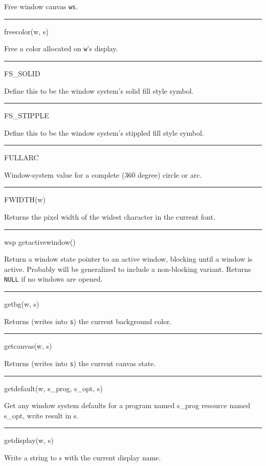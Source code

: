 Free window canvas \texttt{ws}.


\bigskip\hrule\vspace{0.1cm}
\noindent
freecolor(w, s)


Free a color allocated on \texttt{w}{}'s display.


\bigskip\hrule\vspace{0.1cm}
\noindent
FS\_SOLID


Define this to be the window system's solid fill style symbol.


\bigskip\hrule\vspace{0.1cm}
\noindent
FS\_STIPPLE


Define this to be the window system's stippled fill style symbol.


\bigskip\hrule\vspace{0.1cm}
\noindent
FULLARC


Window-system value for a complete (360 degree) circle or arc.


\bigskip\hrule\vspace{0.1cm}
\noindent
FWIDTH(w)


Returns the pixel width of the widest character in the current font.


\bigskip\hrule\vspace{0.1cm}
\noindent
wsp getactivewindow()


Return a window state pointer to an active window, blocking until a
window is active. Probably will be generalized to include a
non-blocking variant. Returns \texttt{NULL} if no windows are opened.


\bigskip\hrule\vspace{0.1cm}
\noindent
getbg(w, s)


Returns (writes into \texttt{s}) the current background color.


\bigskip\hrule\vspace{0.1cm}
\noindent
getcanvas(w, s)


Returns (writes into \texttt{s}) the current canvas state.


\bigskip\hrule\vspace{0.1cm}
\noindent
getdefault(w, s\_prog, s\_opt, s)


Get any window system defaults for a program named s\_prog resource
named s\_opt, write result in s.


\bigskip\hrule\vspace{0.1cm}
\noindent
getdisplay(w, s)


Write a string to s with the current display name.


